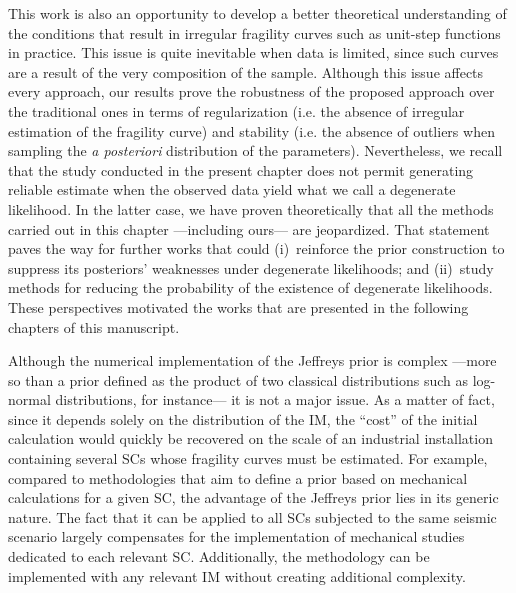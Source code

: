 This work is also an opportunity to develop a better theoretical understanding of the conditions that result in irregular fragility curves such as  unit-step functions in practice. This issue is quite inevitable when data is limited, since such curves are a result of the very composition of the sample. Although this issue affects every approach, 
our results prove the robustness of the proposed approach over the traditional ones in terms of regularization (i.e. the absence of irregular estimation of the fragility curve) and stability (i.e. the absence of outliers when sampling the \emph{a posteriori} distribution of the parameters).  %
Nevertheless, we recall that the study conducted in the present chapter does not permit generating reliable estimate
when the
observed data yield what we call a degenerate likelihood. In the latter case, we have proven theoretically that all the methods carried out in this chapter ---including ours--- are jeopardized.
That statement paves the way for further works that could (i)~reinforce the prior construction to suppress its posteriors' weaknesses under degenerate likelihoods; and (ii)~study methods for reducing the probability of the existence of degenerate likelihoods. These perspectives motivated the works that are presented in the following chapters of this manuscript.



Although the numerical implementation of the Jeffreys prior is complex ---more so than a prior defined as the product of two classical distributions such as log-normal distributions, for instance--- it is not a major issue. As a matter of fact, since it depends solely on the distribution of the IM, the ``cost'' of the initial calculation would quickly be recovered on the scale of an industrial installation containing several SCs whose fragility curves must be estimated. {For example, compared to methodologies that aim to define a prior based on mechanical calculations for a given SC, the advantage of the Jeffreys prior lies in its generic nature. The fact that it can be applied to all SCs subjected to the same seismic scenario largely compensates for the implementation of mechanical studies dedicated to each relevant SC. Additionally, the methodology can be implemented with any relevant IM without creating additional complexity.}


\newpage
\thispagestyle{plain}












